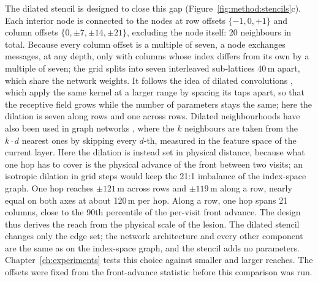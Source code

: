 The dilated stencil is designed to close this gap
(Figure~\ref{fig:method:stencils}c). Each interior node is connected to the
nodes at row offsets $\{-1, 0, +1\}$ and column offsets
$\{0, \pm 7, \pm 14, \pm 21\}$, excluding the node itself: 20 neighbours in
total. Because every column offset is a multiple of seven, a node
exchanges messages, at any depth, only with columns whose index differs
from its own by a multiple of seven; the grid splits into seven
interleaved sub-lattices 40\,\textmu{}m apart, which share the network
weights. It follows the idea of dilated convolutions \citep{Yu2016}, which
apply the same kernel at a larger range by spacing its taps apart, so that
the receptive field grows while the number of parameters stays the same;
here the dilation is seven along rows and one across rows. Dilated
neighbourhoods have also been used in graph networks \citep{Li2019}, where
the $k$ neighbours are taken from the $k \cdot d$ nearest ones by skipping
every $d$-th, measured in the feature space of the current layer. Here the
dilation is instead set in physical distance, because what one hop has to
cover is the physical advance of the front between two visits; an
isotropic dilation in grid steps would keep the 21:1 imbalance of the
index-space graph. One hop reaches $\pm 121$\,\textmu{}m across rows and
$\pm 119$\,\textmu{}m along a row, nearly equal on both axes at about
120\,\textmu{}m per hop. Along a row, one hop spans 21 columns, close to the
90th percentile of the per-visit front advance. The design thus derives the
reach from the physical scale of the lesion. The dilated stencil changes
only the edge set; the network architecture and every other component are
the same as on the index-space graph, and the stencil adds no parameters.
Chapter~\ref{ch:experiments} tests this choice against smaller and larger
reaches. The offsets were fixed from the front-advance statistic before
this comparison was run.

